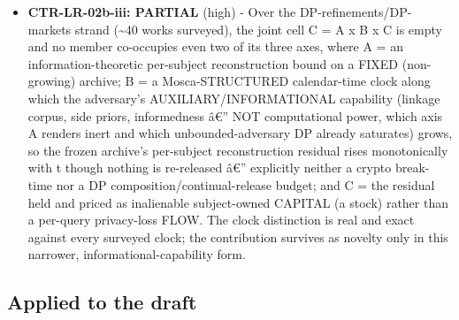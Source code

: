 \documentclass[
  11pt,
]{article}
\begin{document}
\begin{itemize}
  capability-growth clock, but they are a different literature already
  excluded and do not formally index epsilon to calendar time.
\item
  \textbf{CTR-LR-02b-iii: PARTIAL} (high) - Over the
  DP-refinements/DP-markets strand (\textasciitilde40 works surveyed),
  the joint cell C = A x B x C is empty and no member co-occupies even
  two of its three axes, where A = an information-theoretic per-subject
  reconstruction bound on a FIXED (non-growing) archive; B = a
  Mosca-STRUCTURED calendar-time clock along which the adversary's
  AUXILIARY/INFORMATIONAL capability (linkage corpus, side priors,
  informedness â€'' NOT computational power, which axis A renders inert
  and which unbounded-adversary DP already saturates) grows, so the
  frozen archive's per-subject reconstruction residual rises
  monotonically with t though nothing is re-released â€'' explicitly
  neither a crypto break-time nor a DP composition/continual-release
  budget; and C = the residual held and priced as inalienable
  subject-owned CAPITAL (a stock) rather than a per-query privacy-loss
  FLOW. The clock distinction is real and exact against every surveyed
  clock; the contribution survives as novelty only in this narrower,
  informational-capability form.
\end{itemize}

\subsection{Applied to the draft}\label{applied-to-the-draft}
\end{document}
